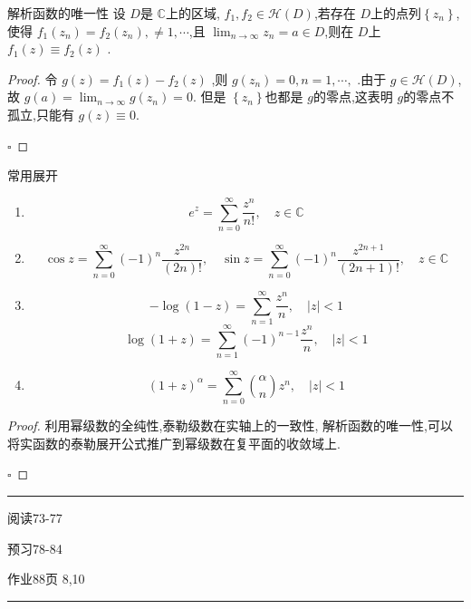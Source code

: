 \documentclass[../../复变函数.tex]{subfiles}
\begin{document}
\begin{theorem}{解析函数的唯一性}
    设 \(  D  \)是 \(  \mathbb{C}   \)上的区域, \(  f_1,f_2\in \mathcal{H}\left( D \right)   \),若存在 \(  D  \)上的点列\(  \left\{ z_{n} \right\}  \),使得 \(  f_1\left( z_{n} \right)= f_2\left( z_{n} \right),\neq  1,\cdots    \),且 \(  \lim_{n\to \infty}z_{n}= a \in D  \),则在 \(  D  \)上 \(  f_1\left(  z\right)\equiv f_2\left( z \right)    \)         .
\end{theorem}
\begin{proof}
    令 \(  g\left( z \right)   = f_1\left( z \right)-f_2\left( z \right)  \) ,则 \(  g\left( z_{n} \right)=  0,n =  1,\cdots,   \) .由于 \(  g \in \mathcal{H}\left( D \right)   \),故 \(  g\left( a \right)= \lim_{n\to \infty}g\left( z_{n} \right)= 0    \). 但是 \(  \left\{ z_{n} \right\}  \)也都是 \(  g  \)的零点,这表明 \(  g  \)的零点不孤立,只能有 \(  g\left( z \right)\equiv 0   \).      

    \hfill $\square$
\end{proof}

\begin{proposition}{常用展开}
    \begin{enumerate}
        \item \[
        e^{z}= \sum _{n = 0}^{\infty} \frac{z^{n} }{n! },\quad z\in \mathbb{C}  
        \]
        \item \[
        \cos z= \sum _{ n = 0}^{\infty}\left( -1 \right)^{n} \frac{z^{2n} }{\left( 2n \right)!  } ,\quad  \sin z= \sum _{ n = 0}^{\infty}\left( -1 \right)^{n}\frac{z^{2n+ 1} }{\left( 2n+ 1 \right)!  },\quad   z \in \mathbb{C}   
        \]
        \item \[
        -\log\left( 1-z \right)=  \sum  _{n = 1}^{\infty} \frac{z^{n} }{n },\quad \left| z \right|< 1   
        \]  \[
        \log\left( 1+ z \right)=  \sum _{ n = 1}^{\infty} \left( -1 \right)^{n-1}\frac{z^{n} }{n },\quad \left| z \right|< 1    
        \]
        \item \[
        \left( 1+ z \right)^{\alpha }= \sum _{ n = 0}^{\infty} \binom{ \alpha    }{n  }z^{n},\quad \left| z \right|< 1   
        \]
    \end{enumerate}
  
\end{proposition}
\begin{proof}
    利用幂级数的全纯性,泰勒级数在实轴上的一致性, 解析函数的唯一性,可以将实函数的泰勒展开公式推广到幂级数在复平面的收敛域上.

    \hfill $\square$
\end{proof}
\hspace*{\fill} 
\hrule
\hspace*{\fill}

阅读73-77

预习78-84

作业88页 8,10


\hspace*{\fill} 
\hrule
\hspace*{\fill}
\end{document}
